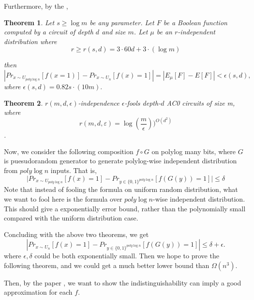 \documentclass[12pt]{article}
\newtheorem{theorem}{Theorem}[section]
\renewcommand{\.}{,\ldots,}
\begin{document}
Furthermore, by the \cite{braverman2010polylogarithmic},
\begin{theorem}
Let $s \ge \log m$ be any parameter. Let $F$ be a Boolean function
computed by a circuit of depth $d$ and size $m$. Let $\mu$ be an $r$-independent distribution
where
$$r \geq  r(s, d) = 3 \cdot 60d+3 \cdot (\log m)$$

then
$$|Pr_{x\sim U_{poly\log n}}[f(x=1)]-Pr_{x\sim U_n}[f(x)=1]|=|E_\mu[F] -E[F]| < \epsilon(s, d),$$
where $\epsilon(s, d) = 0.82s \cdot(10m).$
\end{theorem}
\begin{theorem}
$r(m, d,\epsilon)$-independence $\epsilon$-fools depth-$d$ AC0 circuits of size
m, where
$$r(m, d, ε)=\log(\frac{m}{\epsilon}))^{O(d^2)}$$. 
\end{theorem}

Now, we consider the following composition $f\circ G$ on polylog many bits, where $G$ is puesudorandom generator to generate polylog-wise independent distribution from $poly\log n$ inputs. That is, 
$$\big|Pr_{x\sim U_{poly\log n}}[f(x)=1]-Pr_{y\in\{0,1\}^{poly\log n}}[f(G(y))=1]\big|\leq \delta$$
Note that instead of fooling the formula on uniform random distribution, what we want to fool here is the formula over $poly\log n$-wise independent distribution. This should give a exponentially error bound, rather than the polynomially small compared with the uniform distribution case. 


Concluding with the above two theorems, we get 
$$|Pr_{x\sim U_n}[f(x)=1]-Pr_{y\in\{0,1\}^{poly\log n}}[f(G(y))=1]|\leq \delta+\epsilon.$$
where $\epsilon, \delta$ could be both exponentially small. Then we hope to prove the following theorem, and we could get a much better lower bound than $\Omega(n^3)$.

Then, by the paper \cite{trevisan2009regularity}, we want to show the indistinguishability can imply a good approximation for each $f$.
\end{document}
